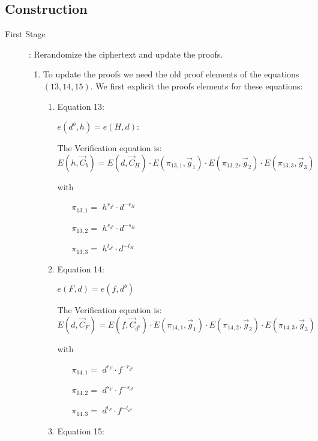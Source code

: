 \subsection{Construction}

\begin{description}
\item[First Stage]: Rerandomize the ciphertext and update the proofs.
  \begin{enumerate}
  \item To update the proofs we need the old proof elements of the equations $(13, 14, 15)$. We first explicit the proofs elements for these equations:
    \begin{enumerate}
    \item Equation 13:

      $e(\boxed{d^b},h) = e(\boxed{H}, d)$: 
      
      The Verification equation is: $E(h, \vec{C}_b) = E(d, \vec{C}_{H}) \cdot E(\pi_{13,1}, \vec{g}_1)\cdot E(\pi_{13,2}, \vec{g}_2)\cdot E(\pi_{13,3}, \vec{g}_3)$

      with
      \begin{itemize}
      \item[$\pi_{13,1} = $] $h^{r_{d^b}} \cdot d^{-r_{H}}$
      \item[$\pi_{13,2} = $] $h^{s_{d^b}} \cdot d^{-s_{H}}$
      \item[$\pi_{13,3} = $] $h^{t_{d^b}} \cdot d^{-t_{H}}$
      \end{itemize}
      
    \item Equation 14:

      $e(\boxed{F},d) = e(f, \boxed{d^b})$

      The Verification equation is: $E(d, \vec{C}_F) = E(f, \vec{C}_{d^b}) \cdot E(\pi_{14,1}, \vec{g}_1)\cdot E(\pi_{14,2}, \vec{g}_2)\cdot E(\pi_{14,3}, \vec{g}_3)$

      with

      \begin{itemize}
      \item[$\pi_{14,1} = $] $d^{r_F} \cdot f^{-r_{d^b}}$    
      \item[$\pi_{14,2} = $] $d^{s_F} \cdot f^{-s_{d^b}}$    
      \item[$\pi_{14,3} = $] $d^{t_F} \cdot f^{-t_{d^b}}$
      \end{itemize}
      
    \item Equation 15:


\end{enumerate}
\end{enumerate}
\end{description}
